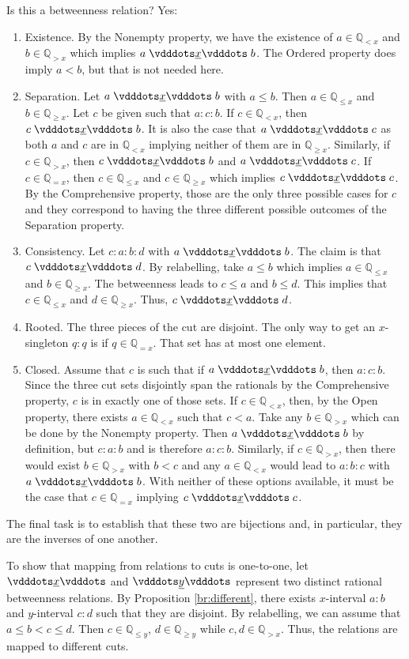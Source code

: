 \documentclass[12pt]{article}
\newcommand{\qcut}[2][x]{\ensuremath{\mathbb{Q}_{#2 #1}}}
\newcommand{\qlt}[1][x]{\qcut[#1]{<}}
\newcommand{\qeq}[1][x]{\qcut[#1]{=}}
\newcommand{\qgt}[1][x]{\qcut[#1]{>}}
\newcommand{\qgeq}[1][x]{\qcut[#1]{\geq}}
\newcommand{\qleq}[1][x]{\qcut[#1]{\leq}}
\newcommand{\yrel}{\xrel[y]}
\begin{document}
Is this a betweenness relation? Yes: 
\begin{enumerate}
    \item Existence. By the Nonempty property, we have the existence of $a \in \qlt$ and $b \in \qgt$ which implies $a \xrel b$. The Ordered property does imply $a < b$, but that is not needed here. 
    \item Separation. Let $a \xrel b$ with $a \leq b$.  Then $a \in \qleq$ and $b \in \qgeq$. Let $c$ be given such that $a:c:b$. If $c \in \qlt$, then  $c \xrel b$. It is also the case that \sout{$a \xrel c$} as both $a$ and $c$ are in $\qlt$ implying neither of them are in $\qgeq$. Similarly, if $c \in \qgt$, then \sout{$c \xrel b$} and $a \xrel c$. If $c \in \qeq$, then $c \in \qleq$ and $c \in \qgeq$ which implies $c \xrel c$. By the Comprehensive property, those are the only three possible cases for $c$ and they correspond to having the three different possible outcomes of the Separation property. 
    \item Consistency. Let $c:a:b:d$ with $ a \xrel b$. The claim is that $c \xrel d$. By relabelling, take $a \leq b$ which implies $a \in \qleq$ and $b \in \qgeq$.  The betweenness leads to $c \leq a$ and $ b \leq d$. This implies that $c \in \qleq$ and $ d \in \qgeq$. Thus, $c \xrel d$.
    \item Rooted. The three pieces of the cut are disjoint. The only way to get an $x$-singleton $q:q$ is if $q \in \qeq$. That set has at most one element. 
    \item Closed. Assume that $c$ is such that if $a \xrel b$, then $a:c:b$. Since the three cut sets disjointly span the rationals by the Comprehensive property, $c$ is in exactly one of those sets. If $c \in \qlt$, then, by the Open property, there exists $a \in \qlt$ such that $c < a$. Take any $b \in \qgt$ which can be done by the Nonempty property. Then $a \xrel b$ by definition, but $c: a:b$ and is therefore \sout{$a:c:b$}. Similarly, if $c \in \qgt$, then there would exist $b \in \qgt$ with $b < c$ and any $a \in \qlt$ would lead to $a:b:c$ with $a \xrel b$. With neither of these options available, it must be the case that $c \in \qeq$ implying $c \xrel c$.    
\end{enumerate}

The final task is to establish that these two are bijections and, in particular, they are the inverses of one another. 

To show that mapping from relations to cuts is one-to-one, let $\xrel$ and $\yrel$ represent two distinct rational betweenness relations. By Proposition \ref{br:different}, there exists $x$-interval $a:b$ and $y$-interval $c:d$ such that they are disjoint. By relabelling, we can assume that $a \leq b < c \leq d$. Then $c \in \qleq[y]$, $d \in \qgeq[y]$ while $c, d \in \qgt[x]$. Thus, the relations are mapped to different cuts. 
\end{document}
